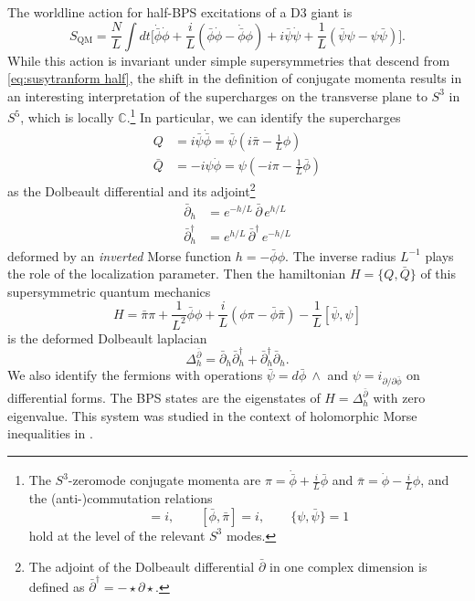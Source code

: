 \documentclass[a4paper,12pt]{article}
\begin{document}
The worldline action for half-BPS excitations of a D3 giant is
\begin{equation}
    S_{\mathrm{QM}} = \frac{N}{L} \int dt \bigg[ \dot{\bar\phi} \dot\phi + \frac{i}{L} \left( \bar\phi \dot\phi - \dot{\bar\phi} \phi \right) + i \bar\psi \dot{\psi} + \frac{1}{L} (\bar\psi \psi - \psi \bar\psi) \bigg].
\end{equation}
While this action is invariant under simple supersymmetries that descend from \eqref{eq:susytranform half}, the shift in the definition of conjugate momenta results in an interesting interpretation of the supercharges on the transverse plane to $S^3$ in $S^5$, which is locally $\mathbb{C}$.\footnote{The $S^3$-zeromode conjugate momenta are $\pi = \dot{\bar{\phi}} + \frac{i}{L} \bar\phi$ and $\bar\pi = \dot{\phi} - \frac{i}{L} \phi$, and the (anti-)commutation relations
\begin{equation}
[\phi,\pi] = i, \qquad [\bar\phi,\bar\pi] = i, \qquad \{ \psi,\bar\psi \} = 1
\end{equation}
hold at the level of the relevant $S^3$ modes.} In particular, we can identify the supercharges
\begin{align}
    Q &= i \bar\psi \dot{\bar\phi} = \bar\psi ( i \bar\pi - \tfrac{1}{L} \phi ) \nonumber \\
    \bar{Q} &= -i \psi \dot\phi = \psi (-i \pi - \tfrac{1}{L} \bar\phi )
\end{align}
as the Dolbeault differential and its adjoint\footnote{The adjoint of the Dolbeault differential $\bar\partial$ in one complex dimension is defined as $\bar\partial^\dag = - \star \partial \star$.}
\begin{align}
    \bar\partial_h &= e^{-h/L} \, \bar\partial \, e^{h/L} \nonumber \\
    \bar\partial_h^\dag &= e^{h/L} \, \bar\partial^\dag \, e^{-h/L}
\end{align}
deformed by an \textit{inverted} Morse function $h = -\bar\phi \phi$. The inverse radius $L^{-1}$ plays the role of the localization parameter. Then the hamiltonian $H = \{ Q, \bar Q \}$ of this supersymmetric quantum mechanics
\begin{equation}
H = \bar\pi \pi + \frac{1}{L^2} \bar\phi \phi + \frac{i}{L} (\phi \pi - \bar\phi \bar\pi) - \frac{1}{L} [ \bar\psi, \psi]
\end{equation}
is the deformed Dolbeault laplacian
\begin{equation}
\Delta_h^{\bar\partial} = \bar\partial_h \bar\partial_h^\dag + \bar\partial_h^\dag \bar\partial_h.
\end{equation}
We also identify the fermions with operations $\bar\psi = d\bar\phi \ \wedge$ and $\psi = i_{\partial/\partial \bar\phi}$ on differential forms. The BPS states are the eigenstates of $H = \Delta_h^{\bar\partial}$ with zero eigenvalue. This system was studied in the context of holomorphic Morse inequalities in \cite{Witten:1984hol}.
\end{document}
